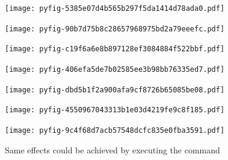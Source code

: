 \documentclass{report}
\begin{document}
\noindent
\texttt{[image: pyfig-5385e07d4b565b297f5da1414d78ada0.pdf]}











\noindent
\texttt{[image: pyfig-90b7d75b8c28657968975bd2a79eeefc.pdf]}











\noindent
\texttt{[image: pyfig-c19f6a6e8b897128ef3084884f522bbf.pdf]}











\noindent
\texttt{[image: pyfig-406efa5de7b02585ee3b98bb76335ed7.pdf]}











\noindent
\texttt{[image: pyfig-dbd5b1f2a900afa9cf8726b65085be08.pdf]}











\noindent
\texttt{[image: pyfig-4550967043313b1e03d4219fe9c8f185.pdf]}











\noindent
\texttt{[image: pyfig-9c4f68d7acb57548dcfc835e0fba3591.pdf]}






Same effects could be achieved by executing the command
\end{document}

